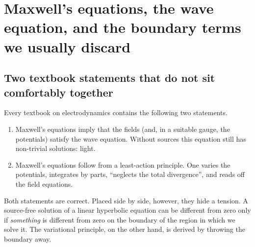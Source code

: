 %
%

\chapter[Maxwell's equations and boundary terms]{Maxwell's equations, the wave equation, and the boundary terms we usually discard}
\label{ch:maxwell-boundary}

\section[Two textbook statements]{Two textbook statements that do not sit comfortably together}
\label{sec:mb-intro}

Every textbook on electrodynamics contains the following two statements.

\begin{enumerate}
\item Maxwell's equations imply that the fields (and, in a suitable gauge,
the potentials) satisfy the wave equation. Without sources this equation
still has non-trivial solutions: light.
\item Maxwell's equations follow from a least-action principle. One varies
the potentials, integrates by parts, ``neglects the total divergence'',
and reads off the field equations.
\end{enumerate}

Both statements are correct. Placed side by side, however, they hide a
tension. A source-free solution of a linear hyperbolic equation can be
different from zero only if \emph{something} is different from zero on the
boundary of the region in which we solve it. The variational principle, on
the other hand, is derived by throwing the boundary away.

